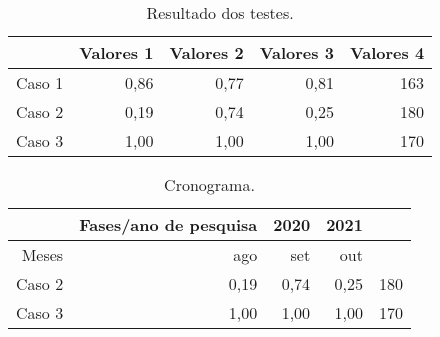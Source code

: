 \begin{table}[!htb]
    \centering
    \caption[Resultado dos testes]{Resultado dos testes.
    \label{tab:tabela-exemplo1}}
    \begin{tabular}{rrrrr}
        \toprule
            & Valores 1 & Valores 2 & Valores 3 & Valores 4 \\
        \midrule
            Caso 1 & 0,86 & 0,77 & 0,81 & 163 \\
            Caso 2 & 0,19 & 0,74 & 0,25 & 180 \\
            Caso 3 & 1,00 & 1,00 & 1,00 & 170 \\
        \bottomrule
    \end{tabular}
\end{table}


\begin{table}[!htb]
    \centering
    \caption[Cronograma]{Cronograma.
    \label{tab:cronograma}}
    \begin{tabular}{rrrrr}
        \toprule
            & Fases/ano de pesquisa & 2020 & 2021 \\
        \midrule
            Meses & ago & set & out &  \\
            Caso 2 & 0,19 & 0,74 & 0,25 & 180 \\
            Caso 3 & 1,00 & 1,00 & 1,00 & 170 \\
        \bottomrule
    \end{tabular}
\end{table}